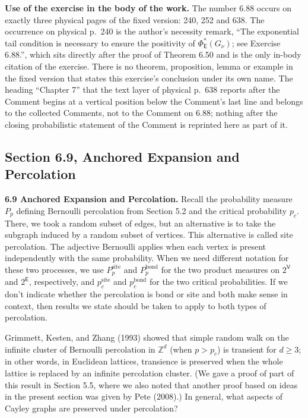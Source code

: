 \documentclass[11pt]{article}
\newcommand{\Z}{\mathbb{Z}}
\newcommand{\V}{\mathsf V}
\newcommand{\E}{\mathsf E}
\newcommand{\loc}[1]{\par\smallskip\noindent{\small\textit{Source: #1}}\par\smallskip}
\begin{document}
\medskip\noindent\textbf{Use of the exercise in the body of the work.}
The number 6.88 occurs on exactly three physical pages of the fixed version: 240, 252 and 638. The occurrence on physical p.\ 240 is the author's necessity remark, ``The exponential tail condition is necessary to ensure the positivity of $\Phi^{*}_{\E}(G_{\nu})$; see Exercise 6.88.'', which sits directly after the proof of Theorem 6.50 and is the only in-body citation of the exercise. There is no theorem, proposition, lemma or example in the fixed version that states this exercise's conclusion under its own name. The heading ``Chapter 7'' that the text layer of physical p.\ 638 reports after the Comment begins at a vertical position below the Comment's last line and belongs to the collected Comments, not to the Comment on 6.88; nothing after the closing probabilistic statement of the Comment is reprinted here as part of it.

\subsection*{Section 6.9, Anchored Expansion and Percolation}
\loc{Physical p.\ 233 (printed p.\ 216).}
\textbf{6.9 Anchored Expansion and Percolation.} Recall the probability measure $P_{p}$ defining Bernoulli percolation from Section 5.2 and the critical probability $p_{c}$. There, we took a random subset of edges, but an alternative is to take the subgraph induced by a random subset of vertices. This alternative is called site percolation. The adjective Bernoulli applies when each vertex is present independently with the same probability. When we need different notation for these two processes, we use $P^{\mathrm{site}}_{p}$ and $P^{\mathrm{bond}}_{p}$ for the two product measures on $2^{\V}$ and $2^{\E}$, respectively, and $p^{\mathrm{site}}_{c}$ and $p^{\mathrm{bond}}_{c}$ for the two critical probabilities. If we don't indicate whether the percolation is bond or site and both make sense in context, then results we state should be taken to apply to both types of percolation.

Grimmett, Kesten, and Zhang (1993) showed that simple random walk on the infinite cluster of Bernoulli percolation in $\Z^{d}$ (when $p>p_{c}$) is transient for $d\ge3$; in other words, in Euclidean lattices, transience is preserved when the whole lattice is replaced by an infinite percolation cluster. (We gave a proof of part of this result in Section 5.5, where we also noted that another proof based on ideas in the present section was given by Pete (2008).) In general, what aspects of Cayley graphs are preserved under percolation?
\end{document}
